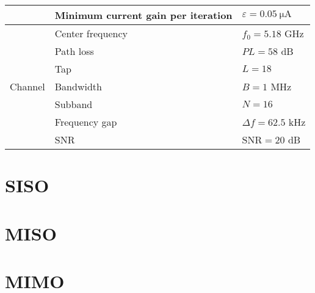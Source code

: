 \begin{table}[h!]
\begin{tabular}{lll}
                              & Minimum current gain per iteration & $\varepsilon  = \SI{0.05}{\uA}$      \\ \hline
\multirow{7}{*}{Channel}        & Center frequency                   & ${f_0} = 5.18$ GHz                   \\
                              & Path loss                          & $PL = 58$ dB                         \\
                              & Tap                                & $L = 18$                             \\
                              & Bandwidth                          & $B = 1$ MHz                          \\
                              & Subband                            & $N = 16$                             \\
                              & Frequency gap                      & $\Delta f = 62.5$ kHz                \\
                              & SNR                                & $\text{SNR} = 20$ dB
\end{tabular}
\label{tab:reference_parameters}
\end{table} 

\section{SISO}\label{sec:siso}
  

\section{MISO}\label{sec:miso}
  

\section{MIMO}\label{sec:mimo}
   